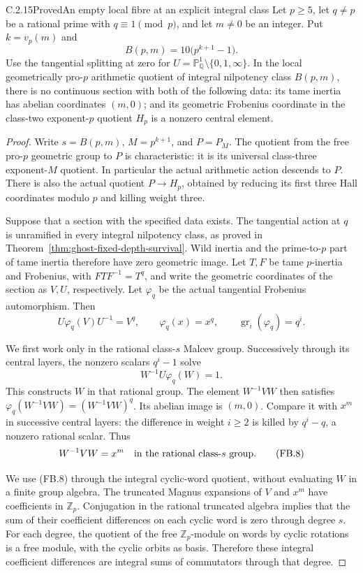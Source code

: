 \begin{result}{C.2.15}{Proved}{An empty local fibre at an explicit integral class}
\label{prop:ghost-finite-local-bound}
Let \(p\ge5\), let \(q\ne p\) be a rational prime with
\(q\equiv1\pmod p\), and let \(m\ne0\) be an integer.
Put \(k=v_p(m)\) and
\[
 B(p,m)=10\bigl(p^{k+1}-1\bigr).
 \tag{FB.5}
\]
Use the tangential splitting at zero for
\(U=\mathbb P^1_{\mathbb Q}\setminus\{0,1,\infty\}\).
In the local geometrically pro-\(p\) arithmetic quotient
of integral nilpotency class \(B(p,m)\), there is no
continuous section with both of the following data:
its tame inertia has abelian coordinates \((m,0)\);
and its geometric Frobenius coordinate in the
class-two exponent-\(p\) quotient \(H_p\) is a
nonzero central element.
\end{result}
\begin{proof}
Write \(s=B(p,m)\), \(M=p^{k+1}\), and \(P=P_M\).
The quotient from the free pro-\(p\) geometric group
to \(P\) is characteristic: it is its universal
class-three exponent-\(M\) quotient.
In particular the actual arithmetic action descends
to \(P\). There is also the actual quotient
\(P\to H_p\), obtained by reducing its first three
Hall coordinates modulo \(p\) and killing weight
three.

Suppose that a section with the specified data
exists. The tangential action at \(q\) is unramified
in every integral nilpotency class, as proved in
Theorem~\ref{thm:ghost-fixed-depth-survival}.
Wild inertia and the prime-to-\(p\) part of tame
inertia therefore have zero geometric image.
Let \(T,F\) be tame \(p\)-inertia and Frobenius, with
\(FTF^{-1}=T^q\), and write the geometric coordinates
of the section as \(V,U\), respectively.
Let \(\varphi_q\) be the actual tangential Frobenius
automorphism. Then
\[
 U\varphi_q(V)U^{-1}=V^q,\qquad
 \varphi_q(x)=x^q,\qquad
 \operatorname{gr}_i(\varphi_q)=q^i .
 \tag{FB.6}
\]

We first work only in the rational class-\(s\)
Malcev group. Successively through its central
layers, the nonzero scalars \(q^i-1\) solve
\[
 W^{-1}U\varphi_q(W)=1.
 \tag{FB.7}
\]
This constructs \(W\) in that rational group.
The element \(W^{-1}VW\) then satisfies
\(\varphi_q(W^{-1}VW)=(W^{-1}VW)^q\).
Its abelian image is \((m,0)\).
Compare it with \(x^m\) in successive central
layers: the difference in weight \(i\ge2\) is
killed by \(q^i-q\), a nonzero rational scalar.
Thus
\[
 W^{-1}VW=x^m
 \quad\hbox{in the rational class-\(s\) group}.
 \tag{FB.8}
\]

We use (FB.8) through the integral cyclic-word
quotient, without evaluating \(W\) in a finite
group algebra. The truncated Magnus expansions
of \(V\) and \(x^m\) have coefficients in
\(\mathbb Z_p\). Conjugation in the rational
truncated algebra implies that the sum of their
coefficient differences on each cyclic word is
zero through degree \(s\).
For each degree, the quotient of the free
\(\mathbb Z_p\)-module on words by cyclic rotations
is a free module, with the cyclic orbits as basis.
Therefore these integral coefficient differences
are integral sums of commutators through that
degree.


\end{proof}
